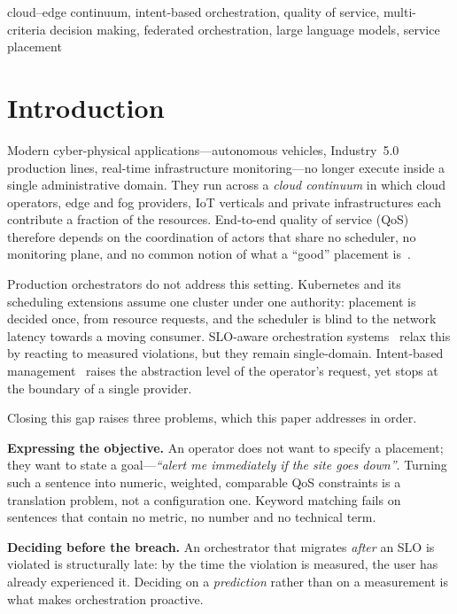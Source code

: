 \documentclass[conference]{IEEEtran}
\begin{document}
\begin{IEEEkeywords}
cloud--edge continuum, intent-based orchestration, quality of service,
multi-criteria decision making, federated orchestration, large language
models, service placement
\end{IEEEkeywords}

\section{Introduction}
\label{sec:intro}

Modern cyber-physical applications---autonomous vehicles, Industry~5.0
production lines, real-time infrastructure monitoring---no longer execute
inside a single administrative domain. They run across a \emph{cloud
continuum} in which cloud operators, edge and fog providers, IoT verticals
and private infrastructures each contribute a fraction of the resources.
End-to-end quality of service (QoS) therefore depends on the coordination of
actors that share no scheduler, no monitoring plane, and no common notion of
what a ``good'' placement is~\cite{mouradian2018,belcastro2025}.

Production orchestrators do not address this setting. Kubernetes and its
scheduling extensions assume one cluster under one authority: placement is
decided once, from resource requests, and the scheduler is blind to the
network latency towards a moving consumer. SLO-aware orchestration
systems~\cite{metsch2023,qonnect2025} relax this by reacting to measured
violations, but they remain single-domain. Intent-based
management~\cite{morichetta2023,sfaxi2026policies} raises the
abstraction level of the operator's request, yet stops at the boundary of a
single provider.

Closing this gap raises three problems, which this paper addresses in order.

\textbf{Expressing the objective.} An operator does not want to specify a
placement; they want to state a goal---\emph{``alert me immediately if the
site goes down''}. Turning such a sentence into numeric, weighted, comparable
QoS constraints is a translation problem, not a configuration one. Keyword
matching fails on sentences that contain no metric, no number and no
technical term.

\textbf{Deciding before the breach.} An orchestrator that migrates
\emph{after} an SLO is violated is structurally late: by the time the
violation is measured, the user has already experienced it. Deciding on a
\emph{prediction} rather than on a measurement is what makes orchestration
proactive.
\end{document}

